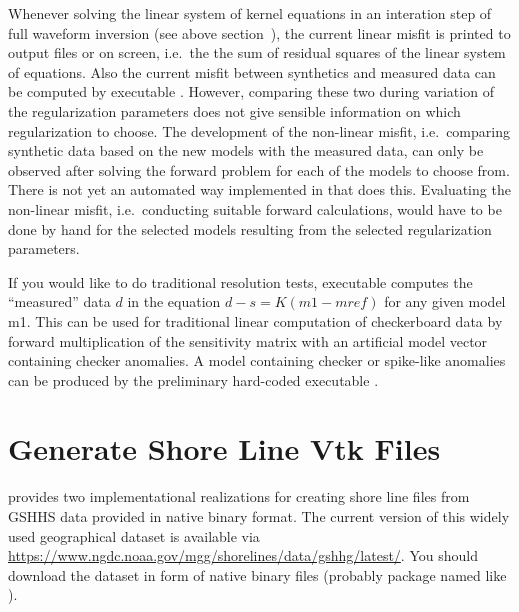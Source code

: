 Whenever solving the linear system of kernel equations in an interation step of full waveform inversion
(see above section~), the current linear misfit is
printed to output files or on screen, i.e.\ the
the sum of residual squares of the linear system of equations. Also the current misfit between synthetics 
and measured data can be computed by executable 
.
However, comparing these two during variation of the regularization parameters does not give sensible
information on which regularization to choose. The development of the non-linear misfit, i.e.\ comparing
synthetic data based on the new models with the measured data, can only be observed after solving the
forward problem for each of the models to choose from. There is not yet an automated way implemented in
\ASKI{} that does this. Evaluating the non-linear misfit, i.e.\ conducting suitable forward calculations, 
would have to be done by hand for the selected models resulting from the selected regularization parameters.

If you would like to do traditional resolution tests, 
executable  
computes the ``measured'' data $d$ in the equation $d-s = K (m1 - mref)$ for any given model m1.
This can be used for traditional linear computation of checkerboard data by forward multiplication 
of the sensitivity matrix with an artificial model vector containing checker anomalies.
A model containing checker or spike-like anomalies can be produced by the preliminary hard-coded executable
 .
%
\section{Generate Shore Line Vtk Files} \label{basic_steps,sec:shoreLines}
%
\ASKI{} provides two implementational realizations for creating shore line  files from GSHHS data 
provided in native binary format. The current version of this widely used geographical dataset is available
via \url{https://www.ngdc.noaa.gov/mgg/shorelines/data/gshhg/latest/}. You should download the 
dataset in form of native binary files (probably package named like ).

